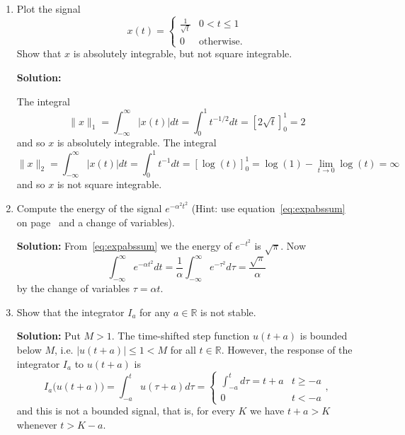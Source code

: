 \documentclass[11pt,a4paper]{book}
\theoremstyle{plain}
\numberwithin{equation}{section}
\newcommand{\reals}{{\mathbb R}}
\newcommand{\abs}[1]{\left\vert #1 \right\vert}
\newcommand{\sabs}[1]{\vert #1 \vert}
\newcommand{\vtick}[1]{\draw (#1,-0.075) -- (#1,0.075) }
\newcommand{\htick}[1]{\draw (-0.075,#1) -- (0.075,#1)}
\newenvironment{solution}{\begin{footnotesize}\textbf{Solution:}}{\end{footnotesize}}
\newenvironment{excersizelist}{%
  \renewcommand*{\theenumi}{\thechapter.\arabic{enumi}}%
  \newcommand\itemadvanced{\stepcounter{enumi}\item[$\ast$\, \theenumi.]}
  \begin{enumerate}
}{%
  \end{enumerate}
}
\begin{document}
\begin{excersizelist}
\item \label{excer:absintnotsquareint} Plot the signal
\[
x(t) = \begin{cases}
\frac{1}{\sqrt{t}} & 0 < t \leq 1 \\
0 & \text{otherwise}.
\end{cases}
\]
Show that $x$ is absolutely integrable, but not square integrable.
\begin{solution}
\begin{center}
\end{center}
The integral
\[
\|x\|_1 = \int_{-\infty}^\infty \abs{x(t)} dt = \int_{0}^1 t^{-1/2} dt = [2\sqrt{t}]_0^1 = 2
\]
and so $x$ is absolutely integrable.  The integral
\[
\|x\|_2 = \int_{-\infty}^\infty \abs{x(t)} dt = \int_{0}^1 t^{-1} dt = [\log(t)]_0^1 = \log(1) - \lim_{t \to 0}\log(t) = \infty
\]
and so $x$ is not square integrable.
\end{solution}

\item \label{excer:energyexpchangevar} Compute the energy of the signal $e^{-\alpha^2 t^2}$ (Hint: use equation~\eqref{eq:expabssum} on page~\pageref{eq:expabssum} and a change of variables).
\begin{solution}
From~\eqref{eq:expabssum} we the energy of $e^{-t^2}$ is $\sqrt{\pi}$.  Now
\[
\int_{-\infty}^\infty e^{-\alpha t^2} dt = \frac{1}{\alpha}\int_{-\infty}^\infty e^{-\tau^2} d\tau = \frac{\sqrt{\pi}}{\alpha}
\]
by the change of variables $\tau = \alpha t$.
\end{solution}

\item \label{excer:integratornotstable} Show that the integrator $I_a$ for any $a\in\reals$ is not  stable.
\begin{solution}
Put $M > 1$.  The time-shifted step function $u(t + a)$ is bounded below $M$, i.e. $\sabs{u(t+a)} \leq 1 < M$ for all $t \in \reals$.  However, the response of the integrator $I_a$ to $u(t+a)$ is
\[
I_a\big(u(t+a)\big) = \int_{-a}^t u(\tau + a)d\tau = \begin{cases}
\int_{-a}^t d\tau = t + a & t \geq -a \\
0 & t < -a 
\end{cases},
\]
and this is not a bounded signal, that is, for every $K$ we have $t + a > K$ whenever $t > K - a$.
\end{solution}


\end{excersizelist}
\end{document}
